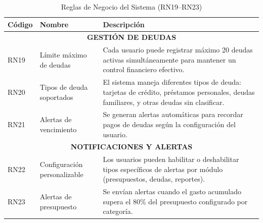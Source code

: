 \begin{table}[H]
\centering
\renewcommand{\arraystretch}{1.2}
\begin{tabularx}{\textwidth}{@{} l l X @{}}
\toprule
\textbf{Código} & \textbf{Nombre} & \textbf{Descripción} \\
\midrule

\multicolumn{3}{c}{\textbf{GESTIÓN DE DEUDAS}} \\
\midrule

RN19 & Límite máximo de deudas &
Cada usuario puede registrar máximo 20 deudas activas simultáneamente para mantener un control financiero efectivo. \\

RN20 & Tipos de deuda soportados &
El sistema maneja diferentes tipos de deuda: tarjetas de crédito, préstamos personales, deudas familiares, y otras deudas sin clasificar. \\

RN21 & Alertas de vencimiento &
Se generan alertas automáticas para recordar pagos de deudas según la configuración del usuario. \\

\midrule
\multicolumn{3}{c}{\textbf{NOTIFICACIONES Y ALERTAS}} \\
\midrule

RN22 & Configuración personalizable &
Los usuarios pueden habilitar o deshabilitar tipos específicos de alertas por módulo (presupuestos, deudas, reportes). \\

RN23 & Alertas de presupuesto &
Se envían alertas cuando el gasto acumulado supera el 80\% del presupuesto configurado por categoría. \\

\bottomrule
\end{tabularx}
\caption{Reglas de Negocio del Sistema (RN19–RN23)}
\end{table}

